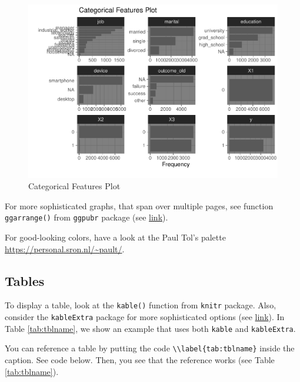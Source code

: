 \documentclass[
]{article}
\begin{document}
\begin{figure}

{\centering \includegraphics[width=0.75\linewidth]{report_files/figure-latex/Categorical Features Plot-1} 

}

\caption{Categorical Features Plot}\label{fig:Categorical Features Plot}
\end{figure}

For more sophisticated graphs, that span over multiple pages, see
function \texttt{ggarrange()} from \texttt{ggpubr} package (see
\href{http://www.sthda.com/english/articles/24-ggpubr-publication-ready-plots/81-ggplot2-easy-way-to-mix-multiple-graphs-on-the-same-page/}{link}).

For good-looking colors, have a look at the Paul Tol's palette
\url{https://personal.sron.nl/~pault/}.

\subsection{Tables}

To display a table, look at the \texttt{kable()} function from
\texttt{knitr} package. Also, consider the \texttt{kableExtra} package
for more sophisticated options (see
\href{https://haozhu233.github.io/kableExtra/awesome_table_in_pdf.pdf}{link}).
In Table \ref{tab:tblname}, we show an example that uses both
\texttt{kable} and \texttt{kableExtra}.

You can reference a table by putting the code
\texttt{\textbackslash{}\textbackslash{}label\{tab:tblname\}} inside the
caption. See code below. Then, you see that the reference works (see
Table \ref{tab:tblname}).
\end{document}
